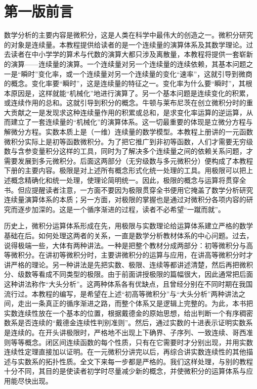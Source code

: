 \chapter*{第一版前言}

数学分析的主要内容是微积分，这是人类在科学中最伟大的创造之一。微积分研究的对象是连续量。本教程提供给读者的是一个连续量的演算体系及其数学理论。过去读者在中小学学的算术与代数的演算大都只涉及离散量，本教程将提供一套崭新的演算——连续量的演算。一个连续量对另一个连续量的连续依赖，其基本问题之一是``瞬时''变化率，或一个连续量对另一个连续量的变化``速率''，这就引导到微商的概念。变化率要``瞬时''，这是连续量的特征之一。变化率为什么要``瞬时''，其根本原因是，这样就能``机械化''地进行演算了。另一个基本问题是连续变化的积累，或连续作用的总和。这就引导到积分的概念。牛顿与莱布尼茨在创立微积分时的重大贡献之一是发现求这种连续量作用的积累或总和，是求变化率运算的逆运算，从而建立了一套连续量的``机械化''的演算体系。这一切最重要的体现是立微分方程与解微分方程。实数本质上是（一维）连续量的数学模型。本教程上册讲的一元函数微积分实际上是初等函数微积分。为了把它推广到非初等函数，人们才需要无穷级数与含参变量积分这样的工具，同时为了解决多个连续量之间的依赖关系问题，才需要发展到多元微积分。后面这两部分（无穷级数与多元微积分）便构成了本教程下册的主要内容。极限是对上述所有概念形式化统一处理的工具。用极限可以把上述概念精确化和统一处理，使理论简明统一。因此，极限的概念与运算将贯穿全书。但应提醒读者注意，一方面不要因为极限贯穿全书便用它掩盖了数学分析研究连续量演算体系的本质；另一方面，对极限的掌握也是通过对微积分各项内容的研究而逐步加深的。这是一个循序渐进的过程，读者不必希望``一蹴而就''。

历史上，微积分运算体系形成在先，用极限与实数理论给运算体系建立严格的数学基础在后。如何处理这两者的关系，一直是数学分析教材体系的中心问题。过去，说得极端一些，大体有两种讲法。一种是把整个教材分成两部分：初等微积分与高等微积分。在讲初等微积分时，主要讲微积分的运算与应用，在讲高等微积分时才讲严格的理论。另一种讲法是先把实数、极限、连续等都讲述清楚，然后再把微积分、级数等看成不同类型的极限。由于前面讲授极限的篇幅很大，因此通常把后面这种讲法称作``大头分析''。这两种体系各有优缺点，且曾经分别在不同时期在我国流行过。本教程的编写，是希望在上述``初高等微积分''与``大头分析''两种讲法之间，走出一条真正的循序渐进之路，而整个体系又是逻辑上完整的。为此，本书把实数连续性放在一个基本的位置，根据戴德金的原始思想，给出判断一个有序稠密数系是否连续的``戴德金连续性判别准则''。然后，通过实数的十进表示证明实数系是连续的。在开头讲极限时，严格地不出现上下确界、子序列、一致连续、哥西准则等等概念。闭区间连续函数的每个性质，只有在它需要时才分别出现，并用实数连续性定理直接加以证明。在一元微积分讲完以后，再综合讲实数连续性的其他描述与实数系的拓扑性质。全文下来每一步都是严格的。我们这样处理，与别的教程十分不同，其目的是使读者初学时尽量减少新的概念，并使微积分的运算体系与应用能尽快出现。

